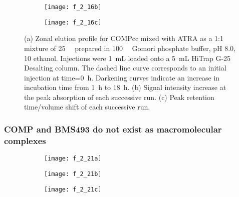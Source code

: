 \begin{refsection}
\begin{figure}[h!]
    \begin{subfigure}[b]{0.5\textwidth}
        \texttt{[image: f\_2\_16b]}
        \caption{}
        \label{fig:ze_intensity}
    \end{subfigure}
    \begin{subfigure}[b]{0.45\textwidth}
        \texttt{[image: f\_2\_16c]}
        \caption{}
        \label{fig:ze_retention_times}
    \end{subfigure} \caption[Zonal elution profile for ATRA mixed with
    COMPcc]{(a) Zonal elution profile for COMPcc mixed with ATRA as a 1:1
        mixture of \SI{25}{\micro\moLar} prepared in \SI{100}{\milli\moLar}
        Gomori phosphate buffer, pH 8.0, \SI{10}{\volper} ethanol. Injections
        were \SI{1}{\mL} loaded onto a \SI{5}{\mL} HiTrap G-25 Desalting column.
        The dashed line curve corresponds to an initial injection at
        time=\SI{0}{\hour}. Darkening curves indicate an increase in incubation
        time from \SI{1}{\hour} to \SI{18}{\hour}. (b) Signal intensity increase
        at the peak absorption of each successive run. (c) Peak retention
    time/volume shift of each successive run.}\label{fig:zonal_elution_report}
\end{figure}



\subsubsection{COMP and BMS493 do not exist as macromolecular complexes}

\begin{figure}
    \centering
    \begin{subfigure}[b]{0.8\textwidth}
        \texttt{[image: f\_2\_21a]}
        \caption{}
    \end{subfigure}
    \begin{subfigure}[b]{0.4\textwidth}
        \texttt{[image: f\_2\_21b]}
        \caption{}
    \end{subfigure}
    \begin{subfigure}[b]{0.4\textwidth}
        \texttt{[image: f\_2\_21c]}
        \caption{}
    \end{subfigure}
    \caption{}\label{fig:sec_results}
\end{figure}


\end{refsection}
